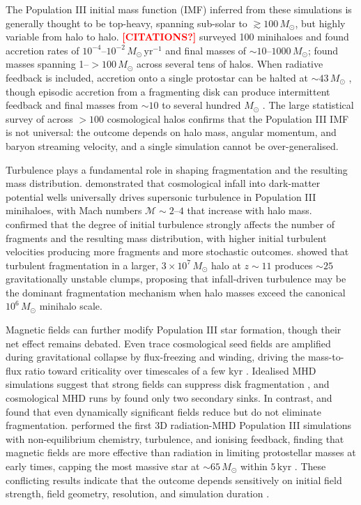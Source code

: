\documentclass[twocolumn]{openjournal}
\newcommand{\note}[1]{\textcolor{red}{\textbf{[#1]}}}
\newcommand{\Msun}{M_\odot}
\newcommand{\kyr}{\,\mathrm{kyr}}
\begin{document}
The Population III initial mass function (IMF) inferred from these simulations
is generally thought to be top-heavy, spanning sub-solar to $\gtrsim 100\,\Msun$,
but highly variable from halo to halo. \note{CITATIONS?}
\citet{hirano14} surveyed 100 minihaloes and found accretion rates of
$10^{-4}$--$10^{-2}\,\Msun\,\mathrm{yr}^{-1}$ and final masses of
$\sim 10$--$1000\,\Msun$; \citet{susa14} found masses spanning
1--$>100\,\Msun$ across several tens of halos.
When radiative feedback is included, accretion onto a single protostar
can be halted at $\sim 43\,\Msun$ \citep{hosokawa11}, though
episodic accretion from a fragmenting disk can produce intermittent
feedback and final masses from $\sim 10$ to several hundred $\Msun$
\citep{hosokawa16, stacy16}.
The large statistical survey of \citet{hirano_sakai23} across
$>100$ cosmological halos confirms that the Population III IMF is not
universal: the outcome depends on halo mass, angular momentum, and
baryon streaming velocity, and a single simulation cannot be
over-generalised.

Turbulence plays a fundamental role in shaping fragmentation and the
resulting mass distribution.
\citet{ho25} demonstrated that cosmological infall into dark-matter
potential wells universally drives supersonic turbulence in Population III
minihaloes, with Mach numbers $\mathcal{M} \sim 2$--$4$ that increase
with halo mass.
\citet{wollenberg20} confirmed that the degree of initial turbulence
strongly affects the number of fragments and the resulting mass
distribution, with higher initial turbulent velocities producing more
fragments and more stochastic outcomes.
\citet{prieto11} showed that turbulent fragmentation in a larger,
$3 \times 10^7\,\Msun$ halo at $z \sim 11$ produces $\sim 25$
gravitationally unstable clumps, proposing that infall-driven turbulence
may be the dominant fragmentation mechanism when halo masses exceed the
canonical $10^6\,\Msun$ minihalo scale.

Magnetic fields can further modify Population III star formation, though their
net effect remains debated.
Even trace cosmological seed fields are amplified during gravitational
collapse by flux-freezing and winding, driving the mass-to-flux ratio
toward criticality over timescales of a few kyr
\citep{machida08, sharda21, higashi24}.
Idealised MHD simulations suggest that strong fields can suppress disk
fragmentation \citep{hirano_machida22}, and cosmological MHD runs
by \citet{stacy22} found only two secondary sinks.
In contrast, \citet{prole22} and \citet{tanaka24} found that even
dynamically significant fields reduce but do not eliminate fragmentation.
\citet{sharda_menon25} performed the first
3D radiation-MHD Population III simulations with non-equilibrium chemistry,
turbulence, and ionising feedback, finding that magnetic fields are more
effective than radiation in limiting protostellar masses at early times,
capping the most massive star at $\sim 65\,\Msun$ within $5\kyr$
\citep[see also][]{prole25}.
These conflicting results indicate that the outcome depends sensitively
on initial field strength, field geometry, resolution, and simulation
duration \citep{klessen_glover23}.
\end{document}
